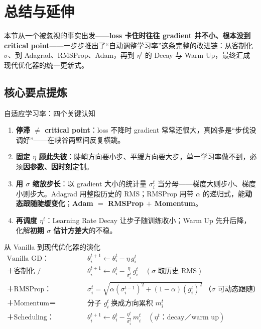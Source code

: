 \documentclass[a4paper]{article}
\begin{document}
\section{总结与延伸}

本节从一个被忽视的事实出发——\textbf{loss 卡住时往往 gradient 并不小、根本没到 critical point}——一步步推出了``自动调整学习率''这条完整的改进链：从客制化 $\sigma$、到 Adagrad、RMSProp、Adam，再到 $\eta^{t}$ 的 Decay 与 Warm Up，最终汇成现代优化器的统一更新式。

\subsection{核心要点提炼}

\begin{importantbox}{自适应学习率：四个关键认知}
    \begin{enumerate}
        \item \textbf{停滞 $\ne$ critical point}：loss 不降时 gradient 常常还很大，真凶多是``步伐没调好''——在峡谷两壁间反复横跳。
        \item \textbf{固定 $\eta$ 顾此失彼}：陡峭方向要小步、平缓方向要大步，单一学习率做不到，必须\textbf{因参数、因时刻}定制。
        \item \textbf{用 $\sigma$ 缩放步长}：以 gradient 大小的统计量 $\sigma_i^{t}$ 当分母——梯度大则步小、梯度小则步大。Adagrad 用整段历史的 RMS；RMSProp 用带 $\alpha$ 的递归式，能\textbf{动态跟随陡缓变化}；\textbf{Adam $=$ RMSProp $+$ Momentum}。
        \item \textbf{再调度 $\eta^{t}$}：Learning Rate Decay 让步子随训练收小；Warm Up 先升后降，化解\textbf{初期 $\sigma$ 估计方差大}的不稳。
    \end{enumerate}
\end{importantbox}

\begin{importantbox}{从 Vanilla 到现代优化器的演化}
    \begin{align*}
        \text{Vanilla GD：}&\quad \theta_i^{t+1} \leftarrow \theta_i^{t} - \eta\, g_i^{t} \\
        \text{＋客制化 / Adagrad：}&\quad \theta_i^{t+1} \leftarrow \theta_i^{t} - \frac{\eta}{\sigma_i^{t}}\, g_i^{t}\quad(\sigma\text{ 取历史 RMS}) \\
        \text{＋RMSProp：}&\quad \sigma_i^{t} = \sqrt{\alpha(\sigma_i^{t-1})^2+(1-\alpha)(g_i^{t})^2}\ \text{（$\sigma$ 可动态跟随）} \\
        \text{＋Momentum＝Adam：}&\quad \text{分子 } g_i^{t}\ \text{换成方向累积 } m_i^{t} \\
        \text{＋Scheduling：}&\quad \theta_i^{t+1} \leftarrow \theta_i^{t} - \frac{\eta^{t}}{\sigma_i^{t}}\, m_i^{t}\quad(\eta^{t}\text{：decay／warm up})
    \end{align*}
\end{importantbox}
\end{document}
